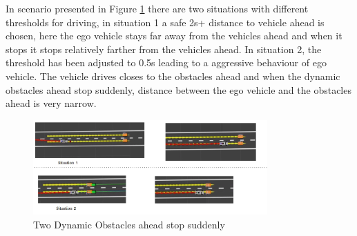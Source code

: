 In scenario presented in Figure \ref{dynamic_2} there are two situations with different thresholds for driving, in situation 1 a safe 2s+ distance to vehicle ahead is chosen, here the ego vehicle stays far away from the vehicles ahead and when it stops it stops relatively farther from the vehicles ahead. In situation 2, the threshold has been adjusted to 0.5s leading to a aggressive behaviour of ego vehicle. The vehicle drives closes to the obstacles ahead and when the dynamic obstacles ahead stop suddenly, distance between the ego vehicle and the obstacles ahead is very narrow.   
\begin{figure}[H]
    \centering
    \includegraphics[width=0.8\textwidth]{Images/evaluation/dynamic_ahead_breaking2.jpg}
    \caption{Two Dynamic Obstacles ahead stop suddenly}
    \label{dynamic_2}
\end{figure}



